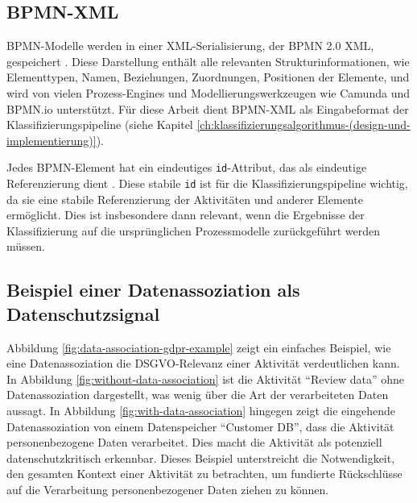 \subsection*{\ac{BPMN}-XML}

\ac{BPMN}-Modelle werden in einer XML-Serialisierung, der \ac{BPMN} 2.0 XML, gespeichert \cite{omgbpmn}. Diese Darstellung enthält alle relevanten Strukturinformationen, wie Elementtypen, Namen, Beziehungen, Zuordnungen, Positionen der Elemente, und wird von vielen Prozess-Engines und Modellierungswerkzeugen wie Camunda \cite{camunda} und BPMN.io \cite{bpmnio} unterstützt. Für diese Arbeit dient \ac{BPMN}-XML als Eingabeformat der Klassifizierungspipeline (siehe Kapitel \ref{ch:klassifizierungsalgorithmus-(design-und-implementierung)}).

Jedes \ac{BPMN}-Element hat ein eindeutiges \texttt{id}-Attribut, das als eindeutige Referenzierung dient \cite{omgbpmn}. Diese stabile \texttt{id} ist für die Klassifizierungspipeline wichtig, da sie eine stabile Referenzierung der Aktivitäten und anderer Elemente ermöglicht. Dies ist insbesondere dann relevant, wenn die Ergebnisse der Klassifizierung auf die ursprünglichen Prozessmodelle zurückgeführt werden müssen.

\subsection*{Beispiel einer Datenassoziation als Datenschutzsignal}

Abbildung \ref{fig:data-association-gdpr-example} zeigt ein einfaches Beispiel, wie eine Datenassoziation die \ac{DSGVO}-Relevanz einer Aktivität verdeutlichen kann. In Abbildung \ref{fig:without-data-association} ist die Aktivität \enquote{Review data} ohne Datenassoziation dargestellt, was wenig über die Art der verarbeiteten Daten aussagt. In Abbildung \ref{fig:with-data-association} hingegen zeigt die eingehende Datenassoziation von einem Datenspeicher \enquote{Customer DB}, dass die Aktivität personenbezogene Daten verarbeitet. Dies macht die Aktivität als potenziell datenschutzkritisch erkennbar. Dieses Beispiel unterstreicht die Notwendigkeit, den gesamten Kontext einer Aktivität zu betrachten, um fundierte Rückschlüsse auf die Verarbeitung personenbezogener Daten ziehen zu können.


